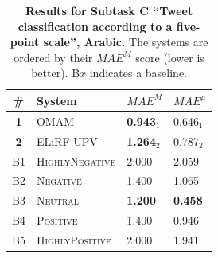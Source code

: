 \begin{table}[h!]
\centering
\begin{small}
\renewcommand{\arraystretch}{1.0}%
\begin{tabular}{|c|l|l|l|}
\hline
      \bf \# & \bf System & \multicolumn{1}{c|}{$MAE^M$} & \multicolumn{1}{c|}{$MAE^{\mu}$} \\
\hline
\bf 1 & OMAM & \bf 0.943$_{1}$ & 0.646$_{1}$ \\
\bf 2 & ELiRF-UPV & \bf 1.264$_{2}$ & 0.787$_{2}$ \\
\hline
B1 & \textsc{HighlyNegative} & 2.000 & 2.059\\
B2 & \textsc{Negative} & 1.400 & 1.065\\
B3 & \textsc{Neutral} & \bf 1.200 & \bf 0.458\\
B4 & \textsc{Positive} & 1.400 & 0.946\\
B5 & \textsc{HighlyPositive} & 2.000 & 1.941\\
\hline
\end{tabular}
\caption{\textbf{Results for Subtask C ``Tweet classification according to a five-point scale'', Arabic.} The systems are ordered by their $MAE^{M}$ score (lower is better). B$x$ indicates a baseline.}
\label{table:ResultsSubtaskC:Arabic}
\end{small}
\end{table}
